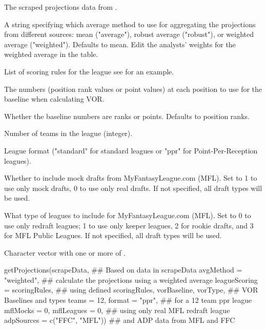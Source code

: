 \documentclass[a4paper]{book}
\begin{document}
\begin{Arguments}
\begin{ldescription}
\item[\code{scrapeData}] The scraped projections data from .

\item[\code{avgMethod}] A string specifying which average method to use for aggregating the
projections from different sources: mean ("average"), robust average ("robust"), or weighted average ("weighted"). Defaults to mean. Edit the analysts' weights for the weighted average in the  table.

\item[\code{leagueScoring}] List of scoring rules for the league see 
for an example.

\item[\code{vorBaseline}] The numbers (position rank values or point values) at each position to use for the baseline when
calculating VOR.

\item[\code{vorType}] Whether the baseline numbers are ranks or points. Defaults to position ranks.

\item[\code{teams}] Number of teams in the league (integer).

\item[\code{format}] League format ("standard" for standard leagues or "ppr" for Point-Per-Reception leagues).

\item[\code{mflMocks}] Whether to include mock drafts from MyFantasyLeague.com (MFL). Set to 1 to use only mock drafts,
0 to use only real drafts. If not specified, all draft types will be used.

\item[\code{mflLeagues}] What type of leagues to include for MyFantasyLeague.com (MFL). Set to 0 to use
only redraft leagues; 1 to use only keeper leagues, 2 for rookie drafts, and
3 for MFL Public Leagues. If not specified, all draft types will be used.

\item[\code{ADPsource}] Character vector with one or more of .
\end{ldescription}
\end{Arguments}
%
\begin{Examples}
\begin{ExampleCode}
getProjections(scrapeData,                    ## Based on data in scrapeData
               avgMethod = "weighted",        ## calculate the projections using a weighted average
               leagueScoring = scoringRules,  ## using defined scoringRules,
               vorBaseline, vorType,          ## VOR Baselines and types
               teams = 12, format = "ppr",    ## for a 12 team ppr league
               mflMocks = 0, mflLeagues = 0,  ## using only real MFL redraft league
               adpSources =  c("FFC", "MFL")) ## and ADP data from MFL and FFC
\end{ExampleCode}
\end{Examples}
\end{document}
